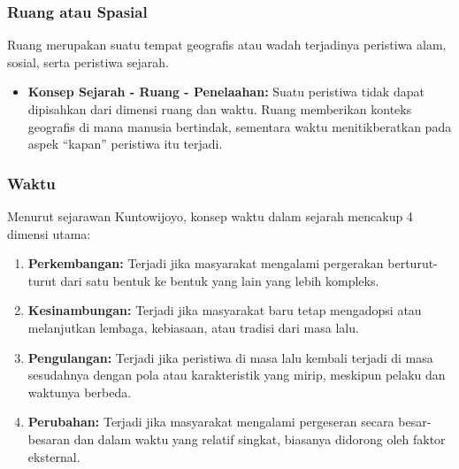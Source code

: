 \documentclass[12pt, a4paper]{article}
\begin{document}
\subsubsection{Ruang atau Spasial}
Ruang merupakan suatu tempat geografis atau wadah terjadinya peristiwa alam, sosial, serta peristiwa sejarah.
\begin{itemize}
	\item \textbf{Konsep Sejarah - Ruang - Penelaahan:} Suatu peristiwa tidak dapat dipisahkan dari dimensi ruang dan waktu. Ruang memberikan konteks geografis di mana manusia bertindak, sementara waktu menitikberatkan pada aspek ``kapan'' peristiwa itu terjadi.
\end{itemize}

\subsubsection{Waktu}
Menurut sejarawan Kuntowijoyo, konsep waktu dalam sejarah mencakup 4 dimensi utama:
\begin{enumerate}
	\item \textbf{Perkembangan:} Terjadi jika masyarakat mengalami pergerakan berturut-turut dari satu bentuk ke bentuk yang lain yang lebih kompleks.
	\item \textbf{Kesinambungan:} Terjadi jika masyarakat baru tetap mengadopsi atau melanjutkan lembaga, kebiasaan, atau tradisi dari masa lalu.
	\item \textbf{Pengulangan:} Terjadi jika peristiwa di masa lalu kembali terjadi di masa sesudahnya dengan pola atau karakteristik yang mirip, meskipun pelaku dan waktunya berbeda.
	\item \textbf{Perubahan:} Terjadi jika masyarakat mengalami pergeseran secara besar-besaran dan dalam waktu yang relatif singkat, biasanya didorong oleh faktor eksternal.
\end{enumerate}
\end{document}
